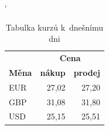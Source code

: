 \documentclass[11pt,a4paper]{article}
\begin{document}
\bigskip

\begin{table}[h]
\catcode` %
\begin{center}
\begin{tabular}{|l|r|r|} \hline
& \multicolumn{2}{|c|}{\textbf{Cena}} \\ \cline{2-3}
\textbf{Měna} & \textbf{nákup} & \textbf{prodej} \\ \hline
EUR & 27,02 & 27,20 \\
GBP & 31,08 & 31,80 \\
USD & 25,15 & 25,51 \\ \hline
\end{tabular}
\caption{Tabulka kurzů k~dnešnímu dni}
\label{tab:kurzy}
\end{center}
\end{table}
\end{document}
